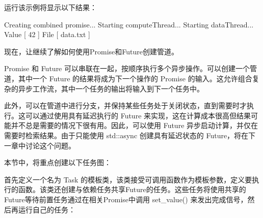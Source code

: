 运行该示例将显示以下结果：

\begin{shell}
Creating combined promise...
Starting computeThread...
Starting dataThread...
Value [ 42 ] File [ data.txt ]
\end{shell}

现在，让继续了解如何使用Promise和Future创建管道。


Promise 和 Future 可以串联在一起，按顺序执行多个异步操作。可以创建一个管道，其中一个 Future 的结果将成为下一个操作的 Promise 的输入。这允许组合复杂的异步工作流，其中一个任务的输出将输入到下一个任务中。

此外，可以在管道中进行分支，并保持某些任务处于关闭状态，直到需要时才执行。这可以通过使用具有延迟执行的 Future 来实现，这在计算成本很高但结果可能并不总是需要的情况下很有用。因此，可以使用 Future 异步启动计算，并仅在需要时检索结果。由于只能使用 std::async 创建具有延迟状态的 Future，将在下一章中讨论这个问题。

本节中，将重点创建以下任务图：


首先定义一个名为 Task 的模板类，该类接受可调用函数作为模板参数，定义要执行的函数。该类还创建与依赖任务共享Future的任务。这些任务将使用共享的Future等待前置任务通过在相关Promise中调用 set\_value() 来发出完成信号，然后再运行自己的任务：

